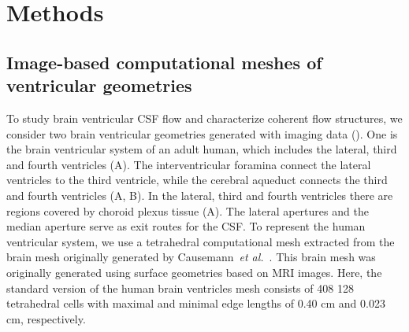 \documentclass{template}
\begin{document}
\section{Methods}
\subsection{Image-based computational meshes of ventricular geometries}
To study brain ventricular CSF flow and characterize coherent flow structures,
we consider two brain ventricular geometries generated with imaging data
(). One is the brain ventricular system of an adult human,
which includes the lateral, third and fourth ventricles (A).
The interventricular foramina connect the lateral ventricles to the third ventricle,
while the cerebral aqueduct connects the third and fourth ventricles (A, B).
In the lateral, third and fourth ventricles there are regions covered by choroid plexus tissue
(A). The lateral apertures and the median aperture serve as exit routes for the CSF.
To represent the human ventricular system, we use a tetrahedral computational mesh extracted
from the brain mesh originally generated by Causemann~\emph{et al.}~\citep{Causemann2022HumanFramework}.
This brain mesh was originally generated using surface geometries based on MRI images.
Here, the standard version of the human brain ventricles mesh consists of
408 128 tetrahedral cells with maximal and minimal edge lengths
of 0.40 cm and 0.023 cm, respectively.
\end{document}
